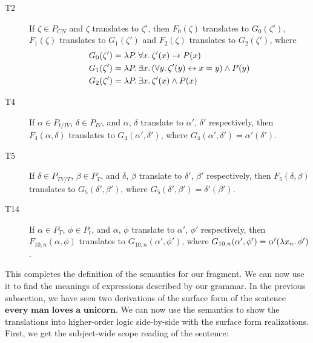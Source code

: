 \begin{description}
\item[T2] If $\zeta \in P_{CN}$ and $\zeta$ translates to $\zeta'$, then
  $F_0(\zeta)$ translates to $G_0(\zeta')$, $F_1(\zeta)$ translates to
  $G_1(\zeta')$ and $F_2(\zeta)$ translates to $G_2(\zeta')$, where
  \begin{align*}
    & G_0(\zeta') = \lambda P.\, \forall x.\, \zeta'(x) \to P(x) \\
    & G_1(\zeta') = \lambda P.\, \exists x.\, (\forall y.\, \zeta'(y) \leftrightarrow x
      = y) \land P(y) \\
    & G_2(\zeta') = \lambda P.\, \exists x.\, \zeta'(x) \land P(x)
  \end{align*}

\item[T4] If $\alpha \in P_{t / IV}$, $\delta \in P_{IV}$, and $\alpha$,
  $\delta$ translate to $\alpha'$, $\delta'$ respectively, then
  $F_4(\alpha, \delta)$ translates to $G_4(\alpha', \delta')$, where
  $G_4(\alpha', \delta') = \alpha'(\delta')$.

\item[T5] If $\delta \in P_{TV / T}$, $\beta \in P_{T}$, and $\delta$,
  $\beta$ translate to $\delta'$, $\beta'$ respectively, then
  $F_5(\delta, \beta)$ translates to $G_5(\delta', \beta')$, where
  $G_5(\delta', \beta') = \delta'(\beta')$.

\item[T14] If $\alpha \in P_T$, $\phi \in P_t$, and $\alpha$, $\phi$
  translate to $\alpha'$, $\phi'$ respectively, then
  $F_{10,n}(\alpha, \phi)$ translates to $G_{10,n}(\alpha', \phi')$, where
  $G_{10,n}(\alpha', \phi') = \alpha'(\lambda x_n.\, \phi')$.
\end{description}

This completes the definition of the semantics for our fragment. We can now
use it to find the meanings of expressions described by our grammar. In the
previous subsection, we have seen two derivations of the surface form of
the sentence $\textbf{every man loves a unicorn}$. We can now use the
semantics to show the translations into higher-order logic side-by-side
with the surface form realizations. First, we get the subject-wide scope
reading of the sentence:

